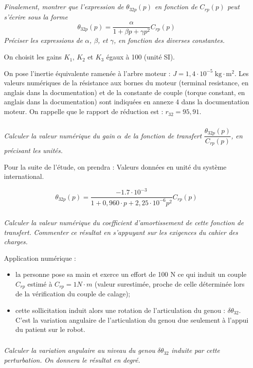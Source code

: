 \documentclass[10pt]{article}
\begin{document}
\subparagraph{}
\textit{Finalement, montrer que l'expression de $\theta_{32p} (p)$ en fonction de $C_{rp} (p)$ peut s'écrire sous la forme 
$$\theta_{32p} (p)=\dfrac{\alpha}{1+\beta p+\gamma p^2} C_{rp} (p)$$
Préciser les expressions de $\alpha$, $\beta$, et $\gamma$, en fonction des diverses constantes.
}

On choisit les gains  $K_1$, $K_2$ et $K_3$ égaux à 100 (unité SI).

On pose l'inertie équivalente ramenée à l'arbre moteur :  $J=1,4 \cdot 10^{-5} \; \text{kg}\cdot\text{m}^2$. Les valeurs numériques de la résistance aux bornes du moteur (terminal resistance, en anglais dans la documentation) et de la constante de couple (torque constant, en anglais dans la documentation) sont indiquées en annexe 4 dans la documentation moteur.
On rappelle que le rapport de réduction est : $r_{32}=95,91$. 



\subparagraph{}
\textit{Calculer la valeur numérique du gain $\alpha$ de la fonction de transfert   $\dfrac{\theta_{32p} (p)}{C_{rp} (p)}$, en précisant les unités.}

Pour la suite de l'étude, on prendra : Valeurs données en unité du système international.

$$
\theta_{32p} (p) = \dfrac{-1.7\cdot 10^{-3}}{1+0,960\cdot p + 2,25 \cdot 10^{-6} p^2} C_{rp} (p)
$$



\subparagraph{}
\textit{Calculer la valeur numérique du coefficient d'amortissement de cette fonction de transfert. Commenter ce résultat en s'appuyant sur les exigences du cahier des charges.}

Application numérique : 
\begin{itemize}
\item la personne pose sa main et exerce un effort de 100 N ce qui induit un couple $C_{rp}$ estimé à $C_{rp}=1 N\cdot m$ (valeur surestimée, proche de celle déterminée lors de la vérification du couple de calage);
\item cette sollicitation induit alors une rotation de l'articulation du genou : $\delta \theta _{32}$. C'est la variation angulaire de l'articulation du genou due seulement à l'appui du patient sur le robot.
\end{itemize}



\subparagraph{}
\textit{Calculer la variation angulaire au niveau du genou $\delta \theta _{32}$ induite par cette perturbation. On donnera le résultat en degré.}
\end{document}
